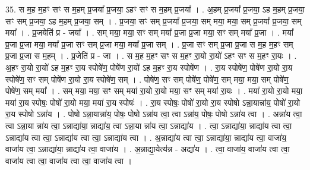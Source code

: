 \documentclass[17pt]{extarticle}
\begin{document}
35. स म॒ह म॒हꣳ सꣳ स म॒हम् प्र॒जया᳚ प्र॒जया॒ ऽहꣳ सꣳ स म॒हम् प्र॒जया᳚ । . अ॒हम् प्र॒जया᳚ प्र॒जया॒ ऽह म॒हम् प्र॒जया॒ सꣳ सम् प्र॒जया॒ ऽह म॒हम् प्र॒जया॒ सम् । . प्र॒जया॒ सꣳ सम् प्र॒जया᳚ प्र॒जया॒ सम् मया॒ मया॒ सम् प्र॒जया᳚ प्र॒जया॒ सम् मया᳚ । . प्र॒जयेति॑ प्र - जया᳚ । . सम् मया॒ मया॒ सꣳ सम् मया᳚ प्र॒जा प्र॒जा मया॒ सꣳ सम् मया᳚ प्र॒जा । . मया᳚ प्र॒जा प्र॒जा मया॒ मया᳚ प्र॒जा सꣳ सम् प्र॒जा मया॒ मया᳚ प्र॒जा सम् । . प्र॒जा सꣳ सम् प्र॒जा प्र॒जा स म॒ह म॒हꣳ सम् प्र॒जा प्र॒जा स म॒हम् । . प्र॒जेति॑ प्र - जा । . स म॒ह म॒हꣳ सꣳ स म॒हꣳ रा॒यो रा॒यो॑ ऽहꣳ सꣳ स म॒हꣳ रा॒यः । . अ॒हꣳ रा॒यो रा॒यो॑ ऽह म॒हꣳ रा॒य स्पोषे॑ण॒ पोषे॑ण रा॒यो॑ ऽह म॒हꣳ रा॒य स्पोषे॑ण । . रा॒य स्पोषे॑ण॒ पोषे॑ण रा॒यो रा॒य स्पोषे॑ण॒ सꣳ सम् पोषे॑ण रा॒यो रा॒य स्पोषे॑ण॒ सम् । . पोषे॑ण॒ सꣳ सम् पोषे॑ण॒ पोषे॑ण॒ सम् मया॒ मया॒ सम् पोषे॑ण॒ पोषे॑ण॒ सम् मया᳚ । . सम् मया॒ मया॒ सꣳ सम् मया॑ रा॒यो रा॒यो मया॒ सꣳ सम् मया॑ रा॒यः । . मया॑ रा॒यो रा॒यो मया॒ मया॑ रा॒य स्पोषः॒ पोषो॑ रा॒यो मया॒ मया॑ रा॒य स्पोषः॑ । . रा॒य स्पोषः॒ पोषो॑ रा॒यो रा॒य स्पोषो ऽन्ना॒यान्ना॑य॒ पोषो॑ रा॒यो रा॒य स्पोषो ऽन्ना॑य । . पोषो ऽन्ना॒यान्ना॑य॒ पोषः॒ पोषो ऽन्ना॑य त्वा॒ त्वा ऽन्ना॑य॒ पोषः॒ पोषो ऽन्ना॑य त्वा । . अन्ना॑य त्वा॒ त्वा ऽन्ना॒या न्ना॑य त्वा॒ ऽन्नाद्या॑या॒ न्नाद्या॑य॒ त्वा ऽन्ना॒या न्ना॑य त्वा॒ ऽन्नाद्या॑य । . त्वा॒ ऽन्नाद्या॑या॒ न्नाद्या॑य त्वा त्वा॒ ऽन्नाद्या॑य त्वा त्वा॒ ऽन्नाद्या॑य त्वा त्वा॒ ऽन्नाद्या॑य त्वा । . अ॒न्नाद्या॑य त्वा त्वा॒ ऽन्नाद्या॑या॒ न्नाद्या॑य त्वा॒ वाजा॑य॒ वाजा॑य त्वा॒ ऽन्नाद्या॑या॒ न्नाद्या॑य त्वा॒ वाजा॑य । . अ॒न्नाद्या॒येत्य॑न्न - अद्या॑य । . त्वा॒ वाजा॑य॒ वाजा॑य त्वा त्वा॒ वाजा॑य त्वा त्वा॒ वाजा॑य त्वा त्वा॒ वाजा॑य त्वा । \newline
\end{document}
